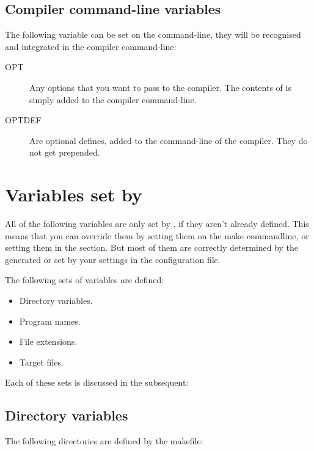 \subsection{Compiler command-line variables }
The following variable can be set on the  command-line,
they will be recognised and integrated in the compiler command-line:

\begin{description}
\item[OPT] Any options that you want to pass to the compiler. The contents
of  is simply added to the compiler command-line.

\item[OPTDEF] Are optional defines, added to the command-line of the
compiler. They do not get  prepended.
\end{description}

\section{Variables set by }

All of the following variables are only set by , if
they aren't already defined. This means that you can override them by
setting them on the make commandline, or setting them in the 
section. But most of them are correctly determined by the generated
 or set by your settings in the configuration file.

The following sets of variables are defined:
\begin{itemize}
\item Directory variables.
\item Program names.
\item File extensions.
\item Target files.
\end{itemize}
Each of these sets is discussed in the subsequent:

\subsection{Directory variables}

The following directories are defined by the makefile:

